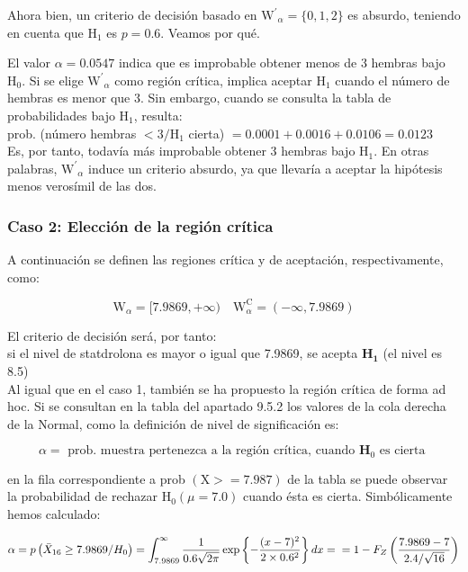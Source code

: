 \documentclass[
]{article}
\begin{document}
Ahora bien, un criterio de decisión basado en \(\mathrm{W}^{\prime}{ }_{\alpha}=\{0,1,2\}\) es absurdo, teniendo en cuenta que \(\mathrm{H}_{1}\) es \(p=0.6\). Veamos por qué.

El valor \(\alpha=0.0547\) indica que es improbable obtener menos de 3 hembras bajo \(\mathrm{H}_{0}\). Si se elige \(\mathrm{W}^{\prime}{ }_{\alpha}\) como región crítica, implica aceptar \(\mathrm{H}_{1}\) cuando el número de hembras es menor que 3. Sin embargo, cuando se consulta la tabla de probabilidades bajo \(\mathrm{H}_{1}\), resulta:\\
prob. (número hembras \(<3 / \mathrm{H}_{1}\) cierta) \(=0.0001+0.0016+0.0106=0.0123\)\\
Es, por tanto, todavía más improbable obtener 3 hembras bajo \(\mathrm{H}_{1}\). En otras palabras, \(\mathrm{W}^{\prime}{ }_{\alpha}\) induce un criterio absurdo, ya que llevaría a aceptar la hipótesis menos verosímil de las dos.

\subsubsection{Caso 2: Elección de la región crítica}\label{caso-2-elecciuxf3n-de-la-regiuxf3n-cruxedtica}

A continuación se definen las regiones crítica y de aceptación, respectivamente, como:

\[
\mathrm{W}_{\alpha}=[7.9869,+\infty) \quad \mathrm{W}_{\alpha}^{\mathrm{C}}=(-\infty, 7.9869)
\]

El criterio de decisión será, por tanto:\\
si el nivel de statdrolona es mayor o igual que 7.9869, se acepta \(\mathbf{H}_{\mathbf{1}}\) (el nivel es 8.5)\\
Al igual que en el caso 1, también se ha propuesto la región crítica de forma ad hoc. Si se consultan en la tabla del apartado 9.5.2 los valores de la cola derecha de la Normal, como la definición de nivel de significación es:

\[
\alpha=\text { prob. muestra pertenezca a la región crítica, cuando } \mathbf{H}_{0} \text { es cierta }
\]

en la fila correspondiente a prob \((\mathrm{X}>=7.987)\) de la tabla se puede observar la probabilidad de rechazar \(\mathrm{H}_{0}(\mu=7.0)\) cuando ésta es cierta. Simbólicamente hemos calculado:

\[
\alpha=p\left(\bar{X}_{16} \geq 7.9869 / H_{0}\right)=\int_{7.9869}^{\infty} \frac{1}{0.6 \sqrt{2 \pi}} \exp \left\{-\frac{(x-7)^{2}}{2 \times 0.6^{2}}\right\} d x=\\ = 1-F_{Z}\left(\frac{7.9869-7}{2.4 / \sqrt{16}}\right)
\]
\end{document}
